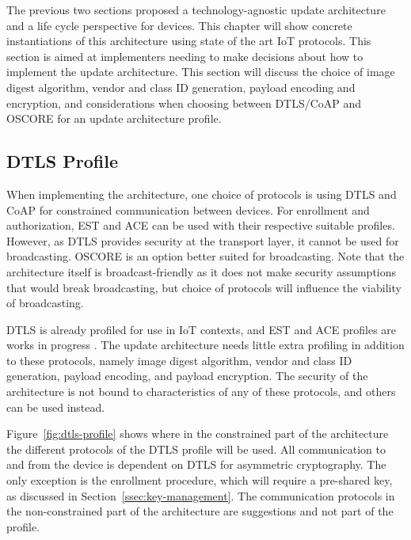 \documentclass[0-thesis.tex]{subfiles}
\begin{document}
\label{chap:profiles}
The previous two sections proposed a technology-agnostic update architecture and a life
cycle perspective for devices. This chapter will show concrete instantiations of this
architecture using state of the art IoT protocols. This section is aimed at implementers
needing to make decisions about how to implement the update architecture. This section
will discuss the choice of image digest algorithm, vendor and class ID generation, payload
encoding and encryption, and considerations when choosing between DTLS/CoAP and OSCORE for
an update architecture profile.

\subsection{DTLS Profile}
\label{ssec:dtls-profile}
When implementing the architecture, one choice of protocols is using DTLS and CoAP for
constrained communication between devices. For enrollment and authorization, EST and ACE
can be used with their respective suitable profiles. However, as DTLS provides security at
the transport layer, it cannot be used for broadcasting. OSCORE is an option better suited
for broadcasting. Note that the architecture itself is broadcast-friendly as it does not
make security assumptions that would break broadcasting, but choice of protocols will
influence the viability of broadcasting.

DTLS is already profiled for use in IoT contexts, and EST and ACE profiles are works in
progress \parencite{rfc7925, est-coaps, ace-dtls-profile}. The update architecture needs
little extra profiling in addition to these protocols, namely image digest algorithm,
vendor and class ID generation, payload encoding, and payload encryption. The security of
the architecture is not bound to characteristics of any of these protocols, and others can
be used instead.

Figure~\ref{fig:dtls-profile} shows where in the constrained part of the architecture the
different protocols of the DTLS profile will be used. All communication to and from the
device is dependent on DTLS for asymmetric cryptography. The only exception is the
enrollment procedure, which will require a pre-shared key, as discussed in
Section~\ref{ssec:key-management}. The communication protocols in the non-constrained part
of the architecture are suggestions and not part of the profile.
\end{document}
